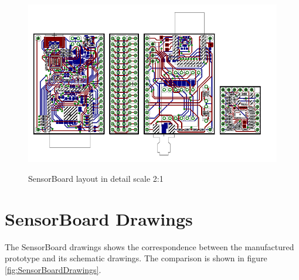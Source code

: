 \begin{figure}
	\centering
	\includegraphics[angle=90, scale=2]{img/brd.pdf}
	\label{brd2}
	\caption{SensorBoard layout in detail scale 2:1}
\end{figure}

\section{SensorBoard Drawings}
The SensorBoard drawings shows the correspondence between the manufactured prototype and its schematic drawings. The comparison is shown in figure \ref{fig:SensorBoardDrawings}.

